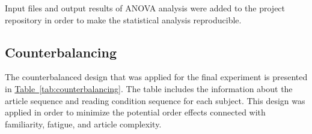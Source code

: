\documentclass{IEEEtran}
\begin{document}
Input files and output results of ANOVA analysis were added to the project repository in order to make the statistical analysis reproducible.


\subsection{Counterbalancing}

The counterbalanced design that was applied for the final experiment is presented in \hyperref[tab:counterbalancing]{Table~\ref*{tab:counterbalancing}}. The table includes the information about the article sequence and reading condition sequence for each subject. This design was applied in order to minimize the potential order effects connected with familiarity, fatigue, and article complexity.

\begin{table}[H]
\centering
\caption{Counterbalanced article and condition order structure used in the final analysis}
\label{tab:counterbalancing}
\label{tab:counterbalancing}
\scriptsize
\renewcommand{\arraystretch}{1.15}


\end{table}
\end{document}
